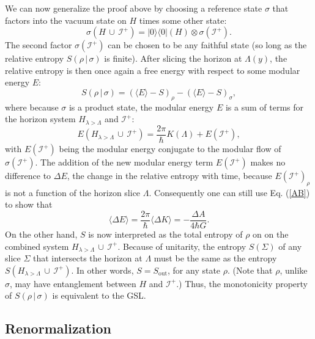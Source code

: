 \documentclass[12pt]{article}
\begin{document}
We can now generalize the proof above by choosing a reference state $\sigma$ that factors into the vacuum state on $H$ times some other state:
\begin{equation}
\sigma(H\,\cup\,\mathcal{I}^+) = |0\rangle \langle 0|(H) \otimes \sigma(\mathcal{I}^+).
\end{equation}
The second factor $\sigma(\mathcal{I}^+)$ can be chosen to be any faithful state (so long as the relative entropy $S(\rho\,|\,\sigma)$ is finite).  After slicing the horizon at $\Lambda(y)$, the relative entropy is then once again a free energy with respect to some modular energy $E$:
\begin{equation}
S(\rho\,|\,\sigma) = ( \langle E \rangle - S)_\rho - (\langle E \rangle - S)_\sigma,
\end{equation}
where because $\sigma$ is a product state, the modular energy $E$ is a sum of terms for the horizon system $H_{\lambda > \Lambda}$ and $\mathcal{I}^+$:
\begin{equation}
E(H_{\lambda > \Lambda}\,\cup\,\mathcal{I}^+) = \frac{2\pi}{\hbar} K(\Lambda) + E(\mathcal{I}^+),
\end{equation}
with $E(\mathcal{I}^+)$ being the modular energy conjugate to the modular flow of $\sigma(\mathcal{I}^+)$.  The addition of the new modular energy term $E(\mathcal{I}^+)$ makes no difference to $\Delta E$, the change in the relative entropy with time, because $E(\mathcal{I}^+)_\rho$ is not a function of the horizon slice $\Lambda$.  Consequently one can still use Eq. (\ref{AB}) to show that
\begin{equation}
\langle \Delta E \rangle = \frac{2\pi}{\hbar} \langle \Delta K \rangle = -\frac{\Delta A}{4\hbar G}.
\end{equation}
On the other hand, $S$ is now interpreted as the total entropy of $\rho$ on on the combined system $H_{\lambda > \Lambda}\,\cup\,\mathcal{I}^+$.  Because of unitarity, the entropy $S(\Sigma)$ of any slice $\Sigma$ that intersects the horizon at $\Lambda$ must be the same as the entropy $S(H_{\lambda > \Lambda}\,\cup\,\mathcal{I}^+)$.  In other words, $S = S_\mathrm{out}$, for any state $\rho$.  (Note that $\rho$, unlike $\sigma$, may have entanglement between $H$ and $\mathcal{I}^+$.)  Thus, the monotonicity property of $S(\rho\,|\,\sigma)$ is equivalent to the GSL.

\subsection{Renormalization}\label{ren}
\end{document}

